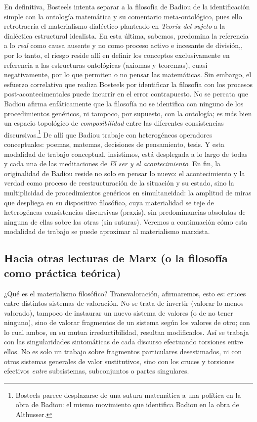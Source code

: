 En definitiva, Bosteels intenta separar a la filosofía de Badiou de la identificación simple con la ontología matemática y su comentario meta-ontológico, pues ello  retrotraería el materialismo dialéctico planteado en \emph{Teoría del sujeto} a la dialéctica estructural idealista. En esta última, sabemos, predomina la referencia a lo \emph{real} como causa ausente y no como proceso activo e incesante de división,, por lo tanto, el riesgo reside allí en definir los conceptos exclusivamente en referencia a las estructuras ontológicas (axiomas y teoremas), cuasi negativamente, por lo que permiten o no pensar las matemáticas. Sin embargo, el esfuerzo correlativo que realiza Bosteels por identificar la filosofía con los procesos post-acontecimentales puede incurrir en el error contrapuesto. No se percata que Badiou afirma enfáticamente que la filosofía no se identifica con ninguno de los procedimientos genéricos, ni tampoco, por supuesto, con la ontología; es más bien un espacio topológico de \emph{composibilidad} entre las diferentes consistencias discursivas.\footnote{Bosteels parece desplazarse de una sutura matemática a una política en la obra de Badiou: el mismo movimiento que identifica Badiou en la obra de Althusser.} De allí que Badiou trabaje con heterogéneos operadores conceptuales: poemas, matemas, decisiones de pensamiento, tesis. Y esta modalidad de trabajo conceptual, insistimos, está desplegada a lo largo de todas y cada una de las meditaciones de \emph{El ser y el acontecimiento}. En fin, la originalidad de Badiou reside no solo en pensar lo nuevo: el acontecimiento y la verdad como proceso de reestructuración de la situación y su estado, sino la multiplicidad de procedimientos genéricos en simultaneidad: la amplitud de miras que despliega en su dispositivo filosófico, cuya materialidad se teje de heterogéneas consistencias discursivas (praxis), sin predominancias absolutas de ninguna de ellas sobre las otras (sin suturas). Veremos a continuación cómo esta modalidad de trabajo se puede aproximar al materialismo marxista.

\subsection{Hacia otras lecturas de Marx (o la filosofía como práctica teórica)} %

¿Qué es el materialismo filosófico? Transvaloración, afirmaremos, esto es: cruces entre distintos sistemas de valoración. No se trata de invertir (valorar lo menos valorado), tampoco de instaurar un nuevo sistema de valores (o de no tener ninguno), sino de valorar fragmentos de un sistema según los valores de otro; con lo cual ambos, en su mutua irreductibilidad, resultan modificados. Así se trabaja con las singularidades sintomáticas de cada discurso efectuando torsiones entre ellos. No es solo un trabajo sobre fragmentos particulares desestimados, ni con otros sistemas generales de valor sustitutivos, sino con los cruces y torsiones efectivos \emph{entre} subsistemas, subconjuntos o partes singulares.

